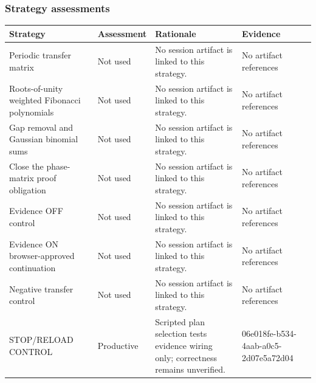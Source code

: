 \documentclass[11pt]{article}
\begin{document}
\subsubsection*{Strategy assessments}
\begin{longtable}{>{\raggedright\arraybackslash}p{.16\linewidth}>{\raggedright\arraybackslash}p{.15\linewidth}>{\raggedright\arraybackslash}p{.40\linewidth}>{\raggedright\arraybackslash}p{.17\linewidth}}
\toprule Strategy & Assessment & Rationale & Evidence \\
\midrule\endhead
Periodic transfer matrix & Not used & No session artifact is linked to this strategy. & No artifact references \\
Roots-of-unity weighted Fibonacci polynomials & Not used & No session artifact is linked to this strategy. & No artifact references \\
Gap removal and Gaussian binomial sums & Not used & No session artifact is linked to this strategy. & No artifact references \\
Close the phase-matrix proof obligation & Not used & No session artifact is linked to this strategy. & No artifact references \\
Evidence OFF control & Not used & No session artifact is linked to this strategy. & No artifact references \\
Evidence ON browser-approved continuation & Not used & No session artifact is linked to this strategy. & No artifact references \\
Negative transfer control & Not used & No session artifact is linked to this strategy. & No artifact references \\
STOP/RELOAD CONTROL & Productive & Scripted plan selection tests evidence wiring only; correctness remains unverified. & 06e018fe-b534-4aab-a0c5-2d07e5a72d04 \\
\bottomrule
\end{longtable}
\end{document}

